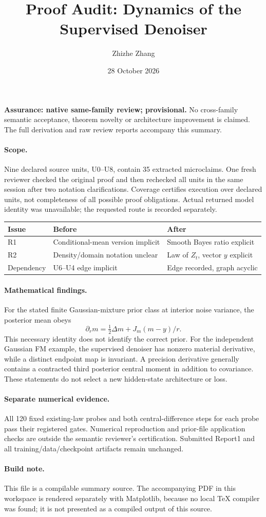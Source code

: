 \documentclass[11pt,a4paper]{article}
\title{Proof Audit: Dynamics of the Supervised Denoiser}
\author{Zhizhe Zhang}
\date{28 October 2026}
\begin{document}
\maketitle
\noindent\textbf{Assurance: native same-family review; provisional.}
No cross-family semantic acceptance, theorem novelty or architecture improvement
is claimed. The full derivation and raw review reports accompany this summary.

\paragraph{Scope.} Nine declared source units, U0--U8, contain 35 extracted
microclaims. One fresh reviewer checked the original proof and then rechecked
all units in the same session after two notation clarifications. Coverage
certifies execution over declared units, not completeness of all possible
proof obligations. Actual returned model identity was unavailable; the
requested route is recorded separately.

\begin{center}
\begin{tabular}{lll}
\toprule
Issue & Before & After\\
\midrule
R1 & Conditional-mean version implicit & Smooth Bayes ratio explicit\\
R2 & Density/domain notation unclear & Law of $Z_t$, vector $y$ explicit\\
Dependency & U6--U4 edge implicit & Edge recorded, graph acyclic\\
\bottomrule
\end{tabular}
\end{center}

\paragraph{Mathematical findings.}
For the stated finite Gaussian-mixture prior class at interior noise variance,
the posterior mean obeys
\[
\partial_r m=\tfrac12\Delta m+J_m(m-y)/r.
\]
This necessary identity does not identify the correct prior. For the independent
Gaussian FM example, the supervised denoiser has nonzero material derivative,
while a distinct endpoint map is invariant. A precision derivative generally
contains a contracted third posterior central moment in addition to covariance.
These statements do not select a new hidden-state architecture or loss.

\paragraph{Separate numerical evidence.}
All 120 fixed existing-law probes and both central-difference steps for each
probe pass their registered gates. Numerical reproduction and prior-file
application checks are outside the semantic reviewer's certification.
Submitted Report1 and all training/data/checkpoint artifacts remain unchanged.

\paragraph{Build note.}
This file is a compilable summary source. The accompanying PDF in this
workspace is rendered separately with Matplotlib, because no local TeX compiler
was found; it is not presented as a compiled output of this source.
\end{document}
